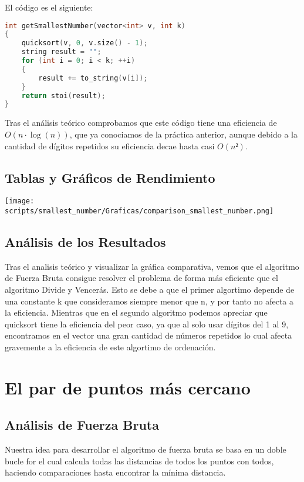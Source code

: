 \documentclass[a4paper,12pt]{article}
\begin{document}
El código es el siguiente:

\begin{lstlisting}[language=C++, caption={Divide y vencerás de \textbf{``El número más pequeño''}}]
int getSmallestNumber(vector<int> v, int k)
{
	quicksort(v, 0, v.size() - 1);
	string result = "";
	for (int i = 0; i < k; ++i)
	{
		result += to_string(v[i]);
	}
	return stoi(result);
}	
	 \end{lstlisting}

Tras el análisis teórico comprobamos que este código tiene una eficiencia de $O(n\cdot \log (n))$, 
que ya conociamos de la práctica anterior, aunque debido a la cantidad de dígitos repetidos su eficiencia decae hasta casi $O(n²)$.\\

\subsection{Tablas y Gráficos de Rendimiento}

\begin{center}
	\texttt{[image: scripts/smallest\_number/Graficas/comparison\_smallest\_number.png]}	
\end{center}


\subsection{Análisis de los Resultados}
Tras el analisis teórico y visualizar la gráfica comparativa, vemos que el algoritmo de Fuerza 
Bruta consigue resolver el problema de forma más eficiente que el algoritmo Divide y Vencerás. 
Esto se debe a que el primer algortimo depende de una constante k que consideramos siempre menor 
que n, y por tanto no afecta a la eficiencia. Mientras que en el segundo algoritmo podemos apreciar 
que quicksort tiene la eficiencia del peor caso, ya que al solo usar dígitos del 1 al 9, encontramos
en el vector una gran cantidad de números repetidos lo cual afecta gravemente a la eficiencia de este 
algortimo de ordenación.


\section{El par de puntos más cercano}
\subsection{Análisis de Fuerza Bruta}
Nuestra idea para desarrollar el algoritmo de fuerza bruta se basa en un doble bucle for el cual calcula todas 
las distancias de todos los puntos con todos, haciendo comparaciones hasta encontrar la mínima distancia. \\
\end{document}
